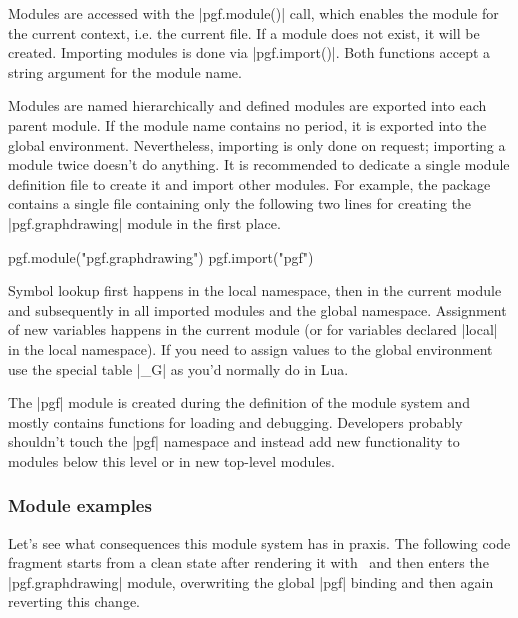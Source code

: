 Modules are accessed with the |pgf.module()| call, which enables the
module for the current context, i.e. the current file. If a module
does not exist, it will be created.  Importing modules is done via
|pgf.import()|.  Both functions accept a string argument for the
module name.

Modules are named hierarchically and defined modules are exported into
each parent module.  If the module name contains no period, it is
exported into the global environment.  Nevertheless, importing is only
done on request; importing a module twice doesn't do anything.
It is recommended to dedicate a single module definition file
to create it and import other modules.  For example, the package
contains a single file containing only the following two lines for
creating the |pgf.graphdrawing| module in the first place.

\begin{codeexample}
pgf.module("pgf.graphdrawing")
pgf.import("pgf")
\end{codeexample}

Symbol lookup first happens in the local namespace, then in the
current module and subsequently in all imported modules and the global
namespace.  Assignment of new variables happens in the current module
(or for variables declared |local| in the local namespace).  If you
need to assign values to the global environment use the special table
|_G| as you'd normally do in Lua.

The |pgf| module is created during the definition of the module system
and mostly contains functions for loading and debugging.  Developers
probably shouldn't touch the |pgf| namespace and instead add new
functionality to modules below this level or in new top-level
modules.

\subsubsection{Module examples}
Let's see what consequences this module system has in praxis.  The
following code fragment starts from a clean state after rendering it
with \LuaTeX\ and then enters the |pgf.graphdrawing| module,
overwriting the global |pgf| binding and then again reverting this
change.

